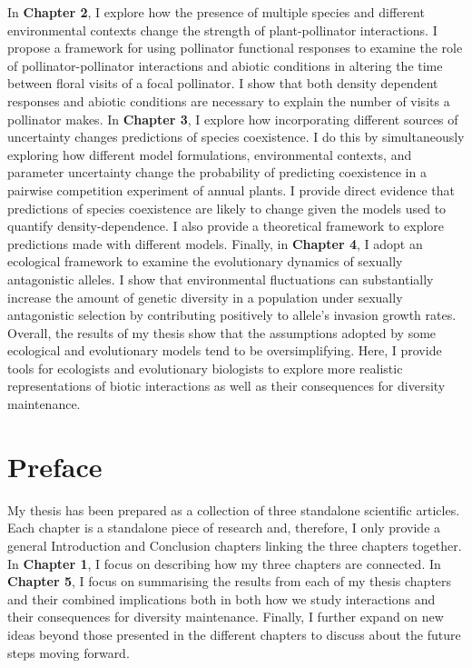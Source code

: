 \documentclass[12pt]{article}
\begin{document}
In \textbf{Chapter 2}, I explore how the presence of multiple species and different environmental contexts change the strength of plant-pollinator interactions. I propose a framework for using pollinator functional responses to examine the role of pollinator-pollinator interactions and abiotic conditions in altering the time between floral visits of a focal pollinator. I show that both density dependent responses and abiotic conditions are necessary to explain the number of visits a pollinator makes. In \textbf{Chapter 3},  I explore how incorporating different sources of uncertainty changes predictions of species coexistence. I do this by simultaneously exploring how different model formulations, environmental contexts, and parameter uncertainty change the probability of predicting coexistence in a pairwise competition experiment of annual plants. I provide direct evidence that predictions of species coexistence are likely to change given the models used to quantify density-dependence. I also provide a theoretical framework to explore predictions made with different models. Finally, in \textbf{Chapter 4}, I adopt an ecological framework to examine the evolutionary dynamics of sexually antagonistic alleles. I show that environmental fluctuations can substantially increase the amount of genetic diversity in a population under sexually antagonistic selection by contributing positively to allele's invasion growth rates. Overall, the results of my thesis show that the assumptions adopted by some ecological and evolutionary models tend to be oversimplifying. Here, I provide tools for ecologists and evolutionary biologists to explore  more realistic representations of biotic interactions as well as their consequences for diversity maintenance.

\clearpage
\section*{Preface}

My thesis has been prepared as a collection of three standalone scientific articles. Each chapter is a standalone piece of research and, therefore, I only provide a general Introduction and Conclusion chapters linking the three chapters together. In  \textbf{Chapter 1}, I focus on describing how my three chapters are connected. In \textbf{Chapter 5}, I focus on summarising the results from each of my thesis chapters and their combined implications both in both how we study interactions and their consequences for diversity maintenance. Finally, I further expand on new ideas beyond those presented in the different chapters to discuss about the future steps moving forward.
\end{document}

